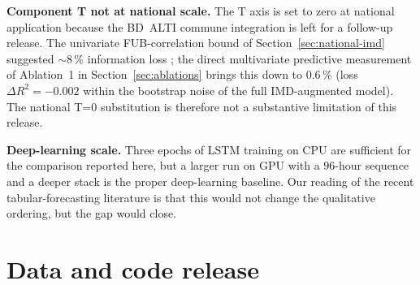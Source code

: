 \documentclass[11pt,a4paper]{article}
\begin{document}
\textbf{Component T not at national scale.}  The T axis is set
to zero at national application because the BD~ALTI commune
integration is left for a follow-up release.  The univariate
FUB-correlation bound of Section~\ref{sec:national-imd} suggested
$\sim 8\,\%$ information loss ; the direct multivariate
predictive measurement of Ablation~1 in
Section~\ref{sec:ablations} brings this down to $0.6\,\%$
(loss $\Delta R^2 = -0.002$ within the bootstrap noise of the
full IMD-augmented model).  The national T=0 substitution is
therefore not a substantive limitation of this release.

\textbf{Deep-learning scale.}  Three epochs of LSTM training on
CPU are sufficient for the comparison reported here, but a
larger run on GPU with a $96$-hour sequence and a deeper stack is
the proper deep-learning baseline.  Our reading of the recent
tabular-forecasting literature \citep{Grinsztajn2022} is that
this would not change the qualitative ordering, but the gap
would close.

\section{Data and code release}
\label{sec:data-release}
\end{document}
